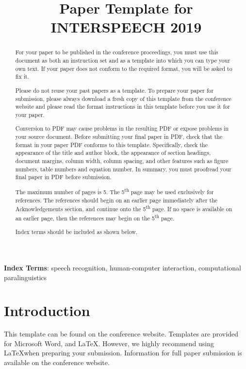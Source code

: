 \documentclass[a4paper]{article}
\title{Paper Template for INTERSPEECH 2019}
\begin{document}
	
	\maketitle
	\begin{abstract}
		For your paper to be published in the conference proceedings, you must use this document as both an instruction set and as a template into which you can type your own text. If your paper does not conform to the required format, you will be asked to fix it.
		
		Please do not reuse your past papers as a template. To prepare your paper for submission, please always download a fresh copy of this template from the conference website and please read the format instructions in this template before you use it for your paper.
		
		Conversion to PDF may cause problems in the resulting PDF or expose problems in your source document. Before submitting your final paper in PDF, check that the format in your paper PDF conforms to this template. Specifically, check the appearance of the title and author block, the appearance of section headings, document margins, column width, column spacing, and other features such as figure numbers, table numbers and equation number. In summary, you must proofread your final paper in PDF before submission.
		
		The maximum number of pages is 5. The 5\textsuperscript{th} page may be used exclusively for references. The references should begin on an earlier page immediately after the Acknowledgements section, and continue onto the 5\textsuperscript{th} page. If no space is available on an earlier page, then the references may begin on the 5\textsuperscript{th} page.
		
		Index terms should be included as shown below.
	\end{abstract}
	\noindent\textbf{Index Terms}: speech recognition, human-computer interaction, computational paralinguistics
	
	\section{Introduction}
	
	This template can be found on the conference website. Templates are provided for Microsoft Word\textregistered, and \LaTeX. However, we highly recommend using \LaTeX when preparing your submission. Information for full paper submission is available on the conference website.
	
\end{document}
